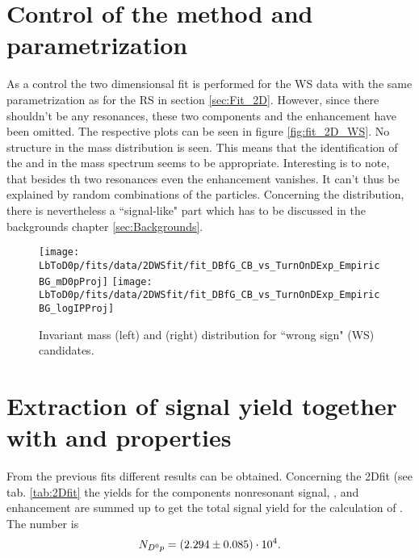 \section{Control of the method and parametrization}

As a control the two dimensionsal fit is performed for the WS data with the same parametrization as for the RS in section \ref{sec:Fit_2D}.
However, since there shouldn't be any resonances, these two components and the enhancement have been omitted.
The respective plots can be seen in figure \ref{fig:fit_2D_WS}. 
No structure in the mass distribution is seen. 
This means that the identification of the \LcResI and \LcResII in the \Dz\proton mass spectrum seems to be appropriate.
Interesting is to note, that besides th two resonances even the enhancement vanishes.
It can't thus be explained by random combinations of the particles.
Concerning the \logIP distribution, there is nevertheless a ``signal-like" part which has to be discussed in the backgrounds chapter \ref{sec:Backgrounds}.

\begin{figure}[hptb]
	\centering
	\texttt{[image: LbToD0p/fits/data/2DWSfit/fit\_DBfG\_CB\_vs\_TurnOnDExp\_EmpiricBG\_mD0pProj]}
	\texttt{[image: LbToD0p/fits/data/2DWSfit/fit\_DBfG\_CB\_vs\_TurnOnDExp\_EmpiricBG\_logIPProj]}
	\caption{Invariant mass (left) and \logIP (right) distribution for ``wrong sign" (WS) candidates.}
	\label{fig:fit_WS}
\end{figure}


\section{Extraction of \LbToDpmunuX signal yield together with \LcResI and \LcResII properties}

From the previous fits different results can be obtained. 
Concerning the 2Dfit (see tab. \ref{tab:2Dfit} the yields for the components nonresonant signal, \LcResI, \LcResII and enhancement are summed up to get the total \LbToDpmunuX signal yield \NDp for the calculation of \R. The number is
\begin{align*}
    N_{{{D}^0}{p}} = (2.294 \pm 0.085)\cdot 10^{4}. 
\end{align*}

